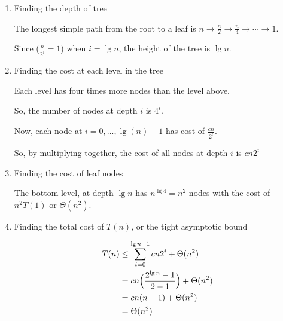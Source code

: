 \documentclass[12pt]{article}
\begin{document}
\begin{enumerate}[1.]
    \begin{enumerate}[1.]
        \item Finding the depth of tree

        \begin{mdframed}

        The longest simple path from the root to a leaf is $n \to \frac{n}{2} \to \frac{n}{4} \to \cdots \to 1$.

        \bigskip

        Since ($\frac{n}{2^i} = 1$) when $i = \lg n$, the height of the tree is $\lg n$.

        \end{mdframed}

        \item Finding the cost at each level in the tree

        \begin{mdframed}

        Each level has four times more nodes than the level above.

        \bigskip

        So, the number of nodes at depth $i$ is $4^i$.

        \bigskip

        Now, each node at $i = 0, ... , \lg(n) - 1$ has cost of $\frac{cn}{2^i}$.

        \bigskip

        So, by multiplying together, the cost of all nodes at depth $i$ is $cn2^i$

        \end{mdframed}

        \item Finding the cost of leaf nodes

        \begin{mdframed}
        The bottom level, at depth $\lg n$ has $n^{\lg 4} = n^2$ nodes with
        the cost of $n^2T(1)$ or $\Theta(n^2)$.

        \end{mdframed}

        \item Finding the total cost of $T(n)$, or the tight asymptotic bound

        \begin{mdframed}

        \begin{align}
            T(n) &\leq \sum\limits_{i=0}^{\lg n - 1} cn2^i + \Theta(n^2)\\
            &= cn \Bigl( \frac{2^{\lg n} - 1}{2 - 1} \Bigr) + \Theta(n^2)\\
            &= cn(n - 1) + \Theta(n^2)\\
            &= \Theta(n^2)
        \end{align}


\end{mdframed}
\end{enumerate}
\end{enumerate}
\end{document}
